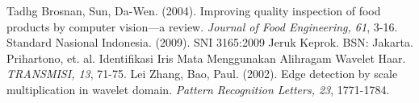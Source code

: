 \documentclass[laporan.tex]{subfiles}
\begin{document}
\begin{thebibliography}{99}
 Tadhg Brosnan, Sun, Da-Wen. (2004). Improving quality inspection of food products by computer vision––a review. \emph{Journal of Food Engineering, 61}, 3-16.
 Standard Nasional Indonesia. (2009). SNI 3165:2009 Jeruk Keprok. BSN: Jakarta.
 Prihartono, et. al. Identifikasi Iris Mata Menggunakan Alihragam Wavelet Haar.  \emph{TRANSMISI, 13}, 71-75.
 Lei Zhang, Bao, Paul. (2002). Edge detection by scale multiplication in wavelet domain. \emph{Pattern Recognition Letters, 23}, 1771-1784.
\end{thebibliography}
\end{document}
